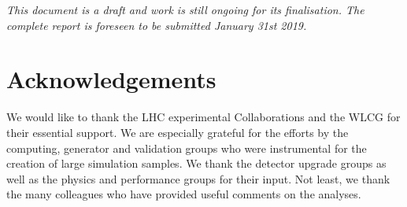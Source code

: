 \documentclass[11pt,twoside,a4paper]{cernrep}
\begin{document}
\begin{titlepage}
\vspace*{2.0cm}

\begin{center}
{\it
This document is a draft and work is still ongoing for its finalisation. The complete report is foreseen to be submitted January 31st 2019. }
\end{center}


\vspace*{2.0cm}
\vspace{\fill}

\end{titlepage}

\setcounter{tocdepth}{3}
\tableofcontents
\newpage

\newpage

\newpage

\newpage

\newpage

\newpage

\newpage

\newpage

\newpage

\newpage

\newpage

\section*{Acknowledgements}
We would like to thank the LHC experimental Collaborations and the WLCG for their essential support.
We are especially grateful for the efforts by the computing, generator and validation groups who were
instrumental for the creation of large simulation samples. We thank the detector upgrade groups as well
as the physics and performance groups for their input.  Not least, we thank the many colleagues who
have provided useful comments on the analyses.



\end{document}
